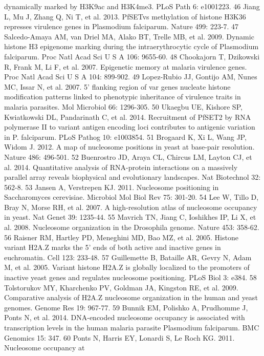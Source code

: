 dynamically marked by H3K9ac and H3K4me3. PLoS Path 6: e1001223.
46  Jiang L, Mu J, Zhang Q, Ni T, et al. 2013. PfSETvs methylation of histone
H3K36 represses virulence genes in Plasmodium falciparum. Nature 499: 223-7.
47  Salcedo-Amaya AM, van Driel MA, Alako BT, Trelle MB, et al. 2009. Dynamic
histone H3 epigenome marking during the intraerythrocytic cycle of Plasmodium
falciparum. Proc Natl Acad Sci U S A 106: 9655-60.
48  Chookajorn T, Dzikowski R, Frank M, Li F, et al. 2007. Epigenetic memory
at malaria virulence genes. Proc Natl Acad Sci U S A 104: 899-902.
49  Lopez-Rubio JJ, Gontijo AM, Nunes MC, Issar N, et al. 2007. 5' flanking
region of var genes nucleate histone modification patterns linked to
phenotypic inheritance of virulence traits in malaria parasites. Mol Microbiol
66: 1296-305.
50  Ukaegbu UE, Kishore SP, Kwiatkowski DL, Pandarinath C, et al. 2014.
Recruitment of PfSET2 by RNA polymerase II to variant antigen encoding loci
contributes to antigenic variation in P. falciparum. PLoS Pathog 10: e1003854.
51  Brogaard K, Xi L, Wang JP, Widom J. 2012. A map of nucleosome positions in
yeast at base-pair resolution. Nature 486: 496-501.
52  Buenrostro JD, Araya CL, Chircus LM, Layton CJ, et al. 2014. Quantitative
analysis of RNA-protein interactions on a massively parallel array reveals
biophysical and evolutionary landscapes. Nat Biotechnol 32: 562-8.
53  Jansen A, Verstrepen KJ. 2011. Nucleosome positioning in Saccharomyces
cerevisiae. Microbiol Mol Biol Rev 75: 301-20.
54  Lee W, Tillo D, Bray N, Morse RH, et al. 2007. A high-resolution atlas of
nucleosome occupancy in yeast. Nat Genet 39: 1235-44.
55  Mavrich TN, Jiang C, Ioshikhes IP, Li X, et al. 2008. Nucleosome
organization in the Drosophila genome. Nature 453: 358-62.
56  Raisner RM, Hartley PD, Meneghini MD, Bao MZ, et al. 2005. Histone variant
H2A.Z marks the 5' ends of both active and inactive genes in euchromatin. Cell
123: 233-48.
57  Guillemette B, Bataille AR, Gevry N, Adam M, et al. 2005. Variant histone
H2A.Z is globally localized to the promoters of inactive yeast genes and
regulates nucleosome positioning. PLoS Biol 3: e384.
58  Tolstorukov MY, Kharchenko PV, Goldman JA, Kingston RE, et al. 2009.
Comparative analysis of H2A.Z nucleosome organization in the human and yeast
genomes. Genome Res 19: 967-77.
59  Bunnik EM, Polishko A, Prudhomme J, Ponts N, et al. 2014. DNA-encoded
nucleosome occupancy is associated with transcription levels in the human
malaria parasite Plasmodium falciparum. BMC Genomics 15: 347.
60  Ponts N, Harris EY, Lonardi S, Le Roch KG. 2011. Nucleosome occupancy at
